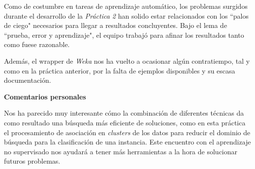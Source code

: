 \documentclass[12pt]{article}
\begin{document}
Como de costumbre en tareas de aprendizaje automático, los problemas surgidos durante el desarrollo de la \textit{Práctica 2} han solido estar relacionados con los ``palos de ciego" necesarios para llegar a resultados concluyentes. Bajo el lema de ``prueba, error y aprendizaje", el equipo trabajó para afinar los resultados tanto como fuese razonable.

Además, el wrapper de \textit{Weka} nos ha vuelto a ocasionar algún contratiempo, tal y como en la práctica anterior, por la falta de ejemplos disponibles y su escasa documentación.

\vspace{0.5cm}
\centerline{\textbf{Comentarios personales}}
\vspace{0.5cm}

Nos ha parecido muy interesante cómo la combinación de diferentes técnicas da como resultado una búsqueda más eficiente de soluciones, como en esta práctica el procesamiento de asociación en \textit{clusters} de los datos para reducir el dominio de búsqueda para la clasificación de una instancia. Este encuentro con el aprendizaje no supervisado nos ayudará a tener más herramientas a la hora de solucionar futuros problemas.
\end{document}
